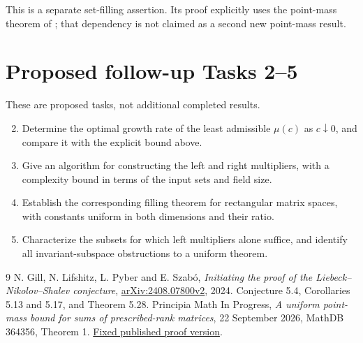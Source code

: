 \documentclass[11pt]{article}
\begin{document}
This is a separate set-filling assertion. Its proof explicitly uses the
point-mass theorem of \cite{rankbound}; that dependency is not claimed
as a second new point-mass result.

\section*{Proposed follow-up Tasks 2--5}
These are proposed tasks, not additional completed results.
\begin{enumerate}
\setcounter{enumi}{1}
\item Determine the optimal growth rate of the least admissible $\mu(c)$
as $c\downarrow0$, and compare it with the explicit bound above.
\item Give an algorithm for constructing the left and right multipliers,
with a complexity bound in terms of the input sets and field size.
\item Establish the corresponding filling theorem for rectangular matrix
spaces, with constants uniform in both dimensions and their ratio.
\item Characterize the subsets for which left multipliers alone suffice,
and identify all invariant-subspace obstructions to a uniform theorem.
\end{enumerate}
\begin{thebibliography}{9}
 N. Gill, N. Lifshitz, L. Pyber and E. Szab\'o,
\emph{Initiating the proof of the Liebeck--Nikolov--Shalev conjecture},
\href{https://arxiv.org/abs/2408.07800v2}{arXiv:2408.07800v2}, 2024.
Conjecture 5.4, Corollaries 5.13 and 5.17, and Theorem 5.28.
 Principia Math In Progress,
\emph{A uniform point-mass bound for sums of prescribed-rank matrices},
22 September 2026, MathDB 364356, Theorem 1.
\href{https://github.com/antoshashakov/Principia-Math-In-Progress/blob/b01f62e992fc0a2038c41c3a728bbe8c928c1896/mathdb-open-problems/problems/364356/solution.pdf}{Fixed published proof version}.
\end{thebibliography}
\end{document}
